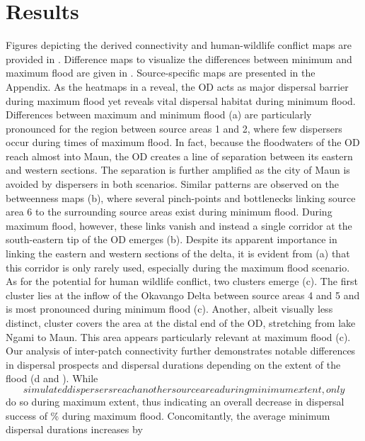 \documentclass[abstract=on,10pt,a4paper,bibliography=totocnumbered]{article}
\begin{document}
\section{Results}
Figures depicting the derived connectivity and human-wildlife conflict maps are
provided in . Difference maps to visualize the differences between
minimum and maximum flood are given in . Source-specific maps
are presented in the Appendix. As the heatmaps in a reveal, the OD
acts as major dispersal barrier during maximum flood yet reveals vital
dispersal habitat during minimum flood. Differences between maximum and minimum
flood (a) are particularly pronounced for the region between
source areas 1 and 2, where few dispersers occur during times of maximum flood.
In fact, because the floodwaters of the OD reach almost into Maun, the OD
creates a line of separation between its eastern and western sections. The
separation is further amplified as the city of Maun is avoided by dispersers in
both scenarios. Similar patterns are observed on the betweenness maps
(b), where several pinch-points and bottlenecks linking source area
6 to the surrounding source areas exist during minimum flood. During maximum
flood, however, these links vanish and instead a single corridor at the
south-eastern tip of the OD emerges (b). Despite its apparent
importance in linking the eastern and western sections of the delta, it is
evident from (a) that this corridor is only rarely used,
especially during the maximum flood scenario. As for the potential for human
wildlife conflict, two clusters emerge (c). The first cluster lies
at the inflow of the Okavango Delta between source areas 4 and 5 and is most
pronounced during minimum flood (c). Another, albeit visually
less distinct, cluster covers the area at the distal end of the OD, stretching
from lake Ngami to Maun. This area appears particularly relevant at maximum
flood (c). Our analysis of inter-patch connectivity further
demonstrates notable differences in dispersal prospects and dispersal durations
depending on the extent of the flood (d and ).
While $$ simulated dispersers reach
another source area during minimum extent, only
$$ do so during maximum extent, thus
indicating an overall decrease in dispersal success of
$$\% during maximum flood.
Concomitantly, the average minimum dispersal durations increases by
\end{document}
